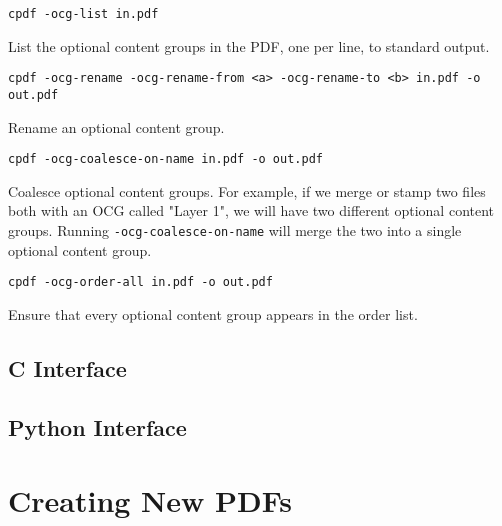 \documentclass{book}
\begin{document}
  {\small\begin{framed}
  \noindent\verb!cpdf -ocg-list in.pdf!
  \end{framed}}

\noindent List the optional content groups in the PDF, one per line, to standard output.
  
  {\small\begin{framed}
  \noindent\verb!cpdf -ocg-rename -ocg-rename-from <a> -ocg-rename-to <b> in.pdf -o out.pdf!
  \end{framed}}

\noindent Rename an optional content group.



  {\small\begin{framed}
  \noindent\verb!cpdf -ocg-coalesce-on-name in.pdf -o out.pdf!
  \end{framed}}


\noindent Coalesce optional content groups. For example, if we merge or stamp two files both with an OCG called "Layer 1", we will have two different optional content groups. Running \texttt{-ocg-coalesce-on-name} will merge the two into a single optional content group.

  {\small\begin{framed}
  \noindent\verb!cpdf -ocg-order-all in.pdf -o out.pdf!
  \end{framed}}

\noindent Ensure that every optional content group appears in the order list.

\begin{cpdflib}
\clearpage
\section*{C Interface}
\begin{small}\tt

\end{small}
\end{cpdflib}

\begin{pycpdflib}
\clearpage
\section*{Python Interface}
\begin{small}\tt

\end{small}
\end{pycpdflib}

\clearpage\pagestyle{empty}
\chapter{Creating New PDFs}\label{chap:17}\pagestyle{fancy}
\end{document}

